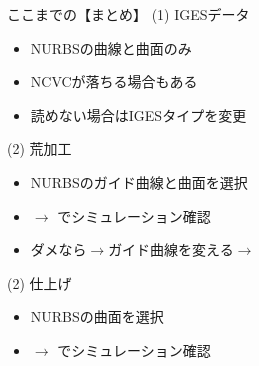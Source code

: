 \newpage
\begin{itembox}[l]{ここまでの【まとめ】}
(1) IGESデータ
\begin{itemize}
\item NURBSの曲線と曲面のみ
\item NCVCが落ちる場合もある
\item 読めない場合はIGESタイプを変更
\end{itemize}
(2) 荒加工
\begin{itemize}
\item NURBSのガイド曲線と曲面を選択
\item {}$\rightarrow$ でシミュレーション確認
\item ダメなら$\rightarrow$ガイド曲線を変える$\rightarrow$
\end{itemize}
(2) 仕上げ
\begin{itemize}
\item NURBSの曲面を選択
\item {}$\rightarrow$ でシミュレーション確認
\end{itemize}
\end{itembox}
